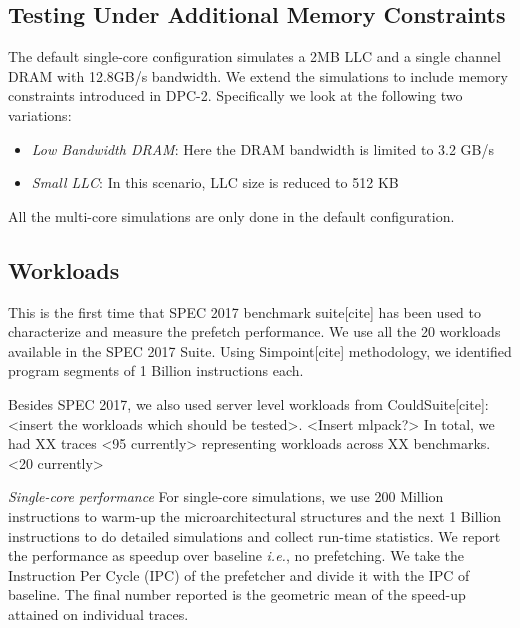 \documentclass{sig-alternate}
\begin{document}
\subsection{Testing Under Additional Memory Constraints}
The default single-core configuration simulates a 2MB LLC and a single channel DRAM with 12.8GB/s bandwidth. 
We extend the simulations to include memory constraints introduced in DPC-2. 
Specifically we look at the following two variations:
\begin{itemize}
    \item \textit{Low Bandwidth DRAM}: Here the DRAM bandwidth is limited to 3.2 GB/s
    \item \textit{Small LLC}: In this scenario, LLC size is reduced to 512 KB
\end{itemize}
All the multi-core simulations are only done in the default configuration.

\subsection{Workloads}
This is the first time that SPEC 2017 benchmark suite[cite] has been used to characterize and measure the prefetch performance. 
We use all the 20 workloads available in the SPEC 2017 Suite. 
Using Simpoint[cite] methodology, we identified program segments of 1 Billion instructions each.

Besides SPEC 2017, we also used server level workloads from CouldSuite[cite]: <insert the workloads which should be tested>. 
<Insert mlpack?> In total, we had XX traces <95 currently> representing workloads across XX benchmarks. 
<20 currently>

\textit{Single-core performance} For single-core simulations, we use 200 Million instructions to warm-up the microarchitectural structures and the next 1 Billion instructions to do detailed simulations and collect run-time statistics. 
We report the performance as speedup over baseline \textit{i.e.}, no prefetching. 
We take the Instruction Per Cycle (IPC) of the prefetcher and divide it with the IPC of baseline. 
The final number reported is the geometric mean of the speed-up attained on individual traces.
\end{document}
